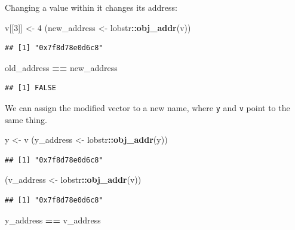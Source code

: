 \documentclass[]{book}
\newenvironment{Shaded}{\begin{snugshade}}{\end{snugshade}}
\newcommand{\DecValTok}[1]{\textcolor[rgb]{0.00,0.00,0.81}{#1}}
\newcommand{\KeywordTok}[1]{\textcolor[rgb]{0.13,0.29,0.53}{\textbf{#1}}}
\newcommand{\NormalTok}[1]{#1}
\newcommand{\OperatorTok}[1]{\textcolor[rgb]{0.81,0.36,0.00}{\textbf{#1}}}
\newcommand{\StringTok}[1]{\textcolor[rgb]{0.31,0.60,0.02}{#1}}
\begin{document}
Changing a value within it changes its address:

\begin{Shaded}
\begin{Highlighting}[]
\NormalTok{v[[}\DecValTok{3}\NormalTok{]] <-}\StringTok{ }\DecValTok{4}
\NormalTok{(new_address <-}\StringTok{ }\NormalTok{lobstr}\OperatorTok{::}\KeywordTok{obj_addr}\NormalTok{(v))}
\end{Highlighting}
\end{Shaded}

\begin{verbatim}
## [1] "0x7f8d78e0d6c8"
\end{verbatim}

\begin{Shaded}
\begin{Highlighting}[]
\NormalTok{old_address }\OperatorTok{==}\StringTok{ }\NormalTok{new_address}
\end{Highlighting}
\end{Shaded}

\begin{verbatim}
## [1] FALSE
\end{verbatim}

We can assign the modified vector to a new name, where \texttt{y} and \texttt{v} point to the same thing.

\begin{Shaded}
\begin{Highlighting}[]
\NormalTok{y <-}\StringTok{ }\NormalTok{v}
\NormalTok{(y_address <-}\StringTok{ }\NormalTok{lobstr}\OperatorTok{::}\KeywordTok{obj_addr}\NormalTok{(y))}
\end{Highlighting}
\end{Shaded}

\begin{verbatim}
## [1] "0x7f8d78e0d6c8"
\end{verbatim}

\begin{Shaded}
\begin{Highlighting}[]
\NormalTok{(v_address <-}\StringTok{ }\NormalTok{lobstr}\OperatorTok{::}\KeywordTok{obj_addr}\NormalTok{(v))}
\end{Highlighting}
\end{Shaded}

\begin{verbatim}
## [1] "0x7f8d78e0d6c8"
\end{verbatim}

\begin{Shaded}
\begin{Highlighting}[]
\NormalTok{y_address }\OperatorTok{==}\StringTok{ }\NormalTok{v_address}
\end{Highlighting}
\end{Shaded}
\end{document}
